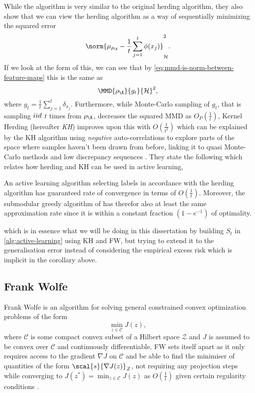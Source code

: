 While the algorithm is very similar to the original herding algorithm, they also show
that we can view the herding algorithm as a way of sequentially minimizing the
squared error
\begin{equation}
  \label{eq:squared-error-herding}
  \norm{\mu_{\rho_{\X}} - \frac{1}{t} \sum_{j=1}^{t} \phi(x_{j})}_{\rkhs{H}}^{2}.
\end{equation}
If we look at the form of this, we can see that by
\ref{eq:mmd-is-norm-between-feature-maps} this is the same as
\begin{equation}
  \MMD{\rho_{\X}}{g_{t}}{\rkhs{H}}^{2},
\end{equation} where \(g_{t} = \frac{1}{t} \sum_{j=1}^{t}
\delta_{x_{j}}\). Furthermore, while Monte-Carlo sampling of \(g_{t}\),
that is sampling \(iid\) \(t\) times from \(\rho_{\X}\), decreases the squared MMD as
\(O_P(\frac{1}{t})\), Kernel Herding (hereafter \textit{KH}) improves upon this
with \(O(\frac{1}{t^{2}})\) which can be explained by the KH algorithm using
\emph{negative} auto-correlations to explore parts of the space where samples
haven't been drawn from before, linking it to quasi Monte-Carlo methods and low
discrepancy sequences
\cite{chen12_super_sampl_from_kernel_herdin,bach12_equiv_between_herdin_condit_gradien_algor}.
They state the following which relates how herding and KH can be used in active
learning,
\begin{corollary} An
  active learning algorithm selecting labels in accordance with the herding
  algorithm has guaranteed rate of convergence in terms of \(O(\frac{1}{t})\).
  Moreover, the submodular greedy algorithm of
  \cite{krause08_near_optim_sensor_placem_gauss_proces} has therefor also at least
  the same approximation rate since it is within a constant fraction \((1 -
  e^{-1})\) of optimality.
\end{corollary}
which is in essence what we will be doing in this dissertation by building
\(S_t\) in \ref{alg:active-learning} using KH and FW, but trying to extend
it to the generalisation error instead of considering the empirical excess risk
which is implicit in the corollary above.

\subsection{Frank Wolfe}
Frank Wolfe \cite{frank56_algor_quadr_progr} is an algorithm for solving general
constrained convex optimization problems of the form
\begin{equation}
\label{eq:constrainted-convex-opt-problem} \min_{z \in \mathcal{C}} J(z),
\end{equation} where \(\mathcal{C}\) is some compact convex subset of a Hilbert
space \(\mathcal{Z}\) and \(J\) is assumed to be convex over \(\mathcal{C}\) and
continuously differentiable. FW sets itself apart as it only requires access to
the gradient \(\nabla J\) on \(\mathcal{C}\) and be able to find the minimiser
of quantities of the form \(\scal{s}{\nabla J(z)}_{\mathcal{Z}}\),  not
requiring any projection steps while converging to \(J(z^{\ast}) = \min_{z
\in \mathcal{C}} J(z)\) as \(O(\frac{1}{t})\) given certain regularity
conditions \cite{jaggi13_revis_frank_wolfe}.

